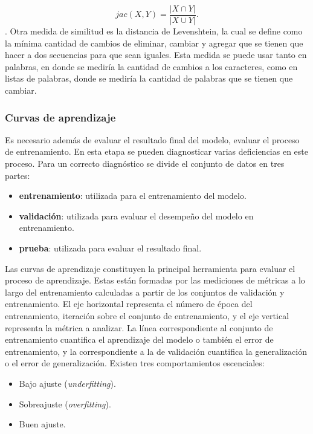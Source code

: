 \begin{equation}
	jac(X, Y) = \frac{|X \cap Y|}{|X \cup Y|}.
\end{equation}.
Otra medida de similitud es la distancia de Levenshtein, la cual se define como la mínima cantidad 
de cambios de eliminar, cambiar y agregar que se tienen que hacer a dos secuencias para que sean 
iguales. Esta medida se puede usar tanto en palabras, en donde se mediría la cantidad de cambios 
a los caracteres, como en listas de palabras, donde se mediría la cantidad de palabras que 
se tienen que cambiar. 

\subsubsection{Curvas de aprendizaje}

Es necesario además de evaluar el resultado final del modelo, evaluar el proceso de entrenamiento. En esta etapa 
se pueden diagnosticar varias deficiencias en este proceso. Para un correcto diagnóstico se divide el conjunto de 
datos en tres partes:

\begin{itemize}
	\item \textbf{entrenamiento}: utilizada para el entrenamiento del modelo.
	\item \textbf{validación}: utilizada para evaluar el desempeño del modelo en entrenamiento.
	\item \textbf{prueba}: utilizada para evaluar el resultado final.
\end{itemize}

Las curvas de aprendizaje constituyen la principal herramienta para evaluar el proceso de aprendizaje.
Estas están formadas por las mediciones de métricas a lo largo del entrenamiento calculadas a partir de 
los conjuntos de validación y entrenamiento. El eje horizontal representa el número de época del entrenamiento,
iteración sobre el conjunto de entrenamiento, y el eje vertical representa la métrica a analizar. 
La línea correspondiente al conjunto de entrenamiento cuantifica 
el aprendizaje del modelo o también el error de entrenamiento, y la correspondiente a la de validación cuantifica 
la generalización o el error de generalización. Existen tres comportamientos escenciales:

\begin{itemize}
	\item Bajo ajuste (\emph{underfitting}).
	\item Sobreajuste (\emph{overfitting}).
	\item Buen ajuste.
\end{itemize}


